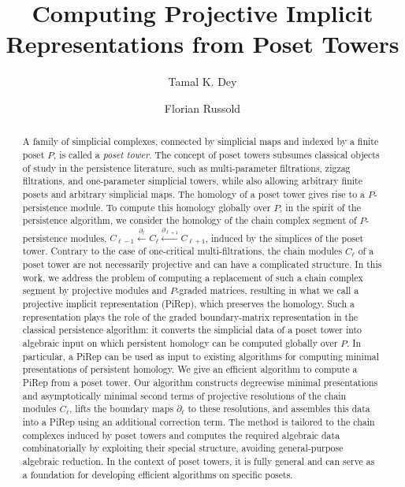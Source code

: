 \documentclass[english,a4paper,nolineno,cleveref]{socg-lipics-v2021}
\title{Computing Projective Implicit Representations from Poset Towers}
\author{Tamal K. Dey}{Department of Computer Science, Purdue University, West Lafayette, USA}{tamaldey@purdue.edu}{https://orcid.org/0000-0001-5160-9738}{Partially supported by NSF grants CCF-2437030 and DMS-2301360}
\author{Florian Russold}{Institute of Geometry, Graz University of Technology, Graz, Austria}{russold@tugraz.at}{https://orcid.org/0009-0003-2978-0477}{Partially supported by Austrian Science Fund (FWF) grants P 33765-N and W1230}
\begin{document}
\maketitle

\begin{abstract}
A family of simplicial complexes, connected by simplicial maps and
indexed by a finite poset $P$, is called a \emph{poset tower}. The concept
of poset towers subsumes classical objects of study in the persistence
literature, such as multi-parameter filtrations, zigzag filtrations, and one-parameter
simplicial towers, while also allowing arbitrary finite posets and arbitrary
simplicial maps. The homology of a poset tower gives rise to a
$P$-persistence module. To compute this homology globally over $P$, in the
spirit of the persistence algorithm, we consider the homology of the chain
complex segment of $P$-persistence modules,
$C_{\ell\minus 1}\xleftarrow{\partial_{\ell}}C_\ell
\xleftarrow{\partial_{\ell+1}}C_{\ell+1}$, induced by the simplices of the
poset tower. Contrary to the case of one-critical multi-filtrations, the
chain modules $C_\ell$ of a poset tower are not necessarily projective and can have a complicated structure. In this work, we address
the problem of computing a replacement of such a chain complex segment by
projective modules and $P$-graded matrices, resulting in what we call a
projective implicit representation (PiRep), which preserves the homology.
Such a representation plays the role of the graded boundary-matrix
representation in the classical persistence algorithm: it converts the
simplicial data of a poset tower into algebraic input on which persistent
homology can be computed globally over $P$. In particular, a PiRep can be
used as input to existing algorithms for computing minimal presentations of
persistent homology. We give an efficient algorithm to compute a PiRep from a poset tower. Our
algorithm constructs degreewise minimal presentations and asymptotically
minimal second terms of projective resolutions of the chain modules
$C_\ell$, lifts the boundary maps $\partial_\ell$ to these resolutions, and
assembles this data into a PiRep using an additional correction term. The
method is tailored to the chain complexes induced by poset towers and
computes the required algebraic data combinatorially by exploiting
their special structure, avoiding general-purpose algebraic reduction. In
the context of poset towers, it is fully general and can serve as a
foundation for developing efficient algorithms on specific posets.    
\end{abstract}
\end{document}
